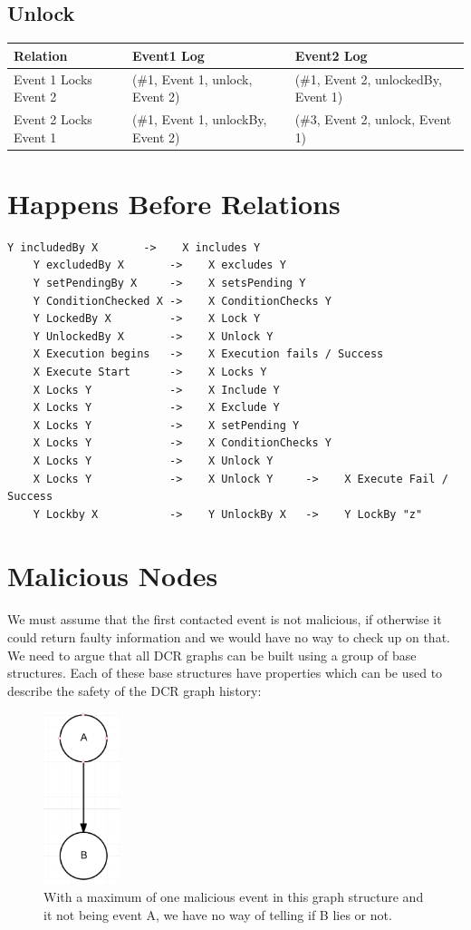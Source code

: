 \subsection{Unlock}
\begin{tabularx}{\textwidth}{|*{3}{>{\raggedright\arraybackslash}X|}}
  \hline
  Relation & Event1 Log & Event2 Log \\
  \hline
  Event 1 Locks Event 2 & (\#1, Event 1, unlock, Event 2) & (\#1, Event 2, unlockedBy, Event 1) \\
  \hline
  Event 2 Locks Event 1 & (\#1, Event 1, unlockBy, Event 2) & (\#3, Event 2, unlock, Event 1) \\
  \hline
\end{tabularx}

\section{Happens Before Relations}

\begin{lstlisting}[breaklines=true]
    Y includedBy X       ->    X includes Y
    Y excludedBy X       ->    X excludes Y
    Y setPendingBy X     ->    X setsPending Y
    Y ConditionChecked X ->    X ConditionChecks Y
    Y LockedBy X         ->    X Lock Y
    Y UnlockedBy X       ->    X Unlock Y
    X Execution begins   ->    X Execution fails / Success
    X Execute Start      ->    X Locks Y
    X Locks Y            ->    X Include Y
    X Locks Y            ->    X Exclude Y
    X Locks Y            ->    X setPending Y
    X Locks Y            ->    X ConditionChecks Y
    X Locks Y            ->    X Unlock Y
    X Locks Y            ->    X Unlock Y     ->    X Execute Fail / Success
    Y Lockby X           ->    Y UnlockBy X   ->    Y LockBy "z"
\end{lstlisting}

\section{Malicious Nodes}
We must assume that the first contacted event is not malicious, if otherwise it could return faulty information and we would have no way to check up on that.
We need to argue that all DCR graphs can be built using a group of base structures. Each of these base structures have properties which can be used to describe the safety of the DCR graph history:

\begin{figure}[H]
	\centering
	\includegraphics[height=5cm]{figures/GraphStructure_OneToOne}
	\caption{With a maximum of one malicious event in this graph structure and it not being event A, we have no way of telling if B lies or not.}
\end{figure}

